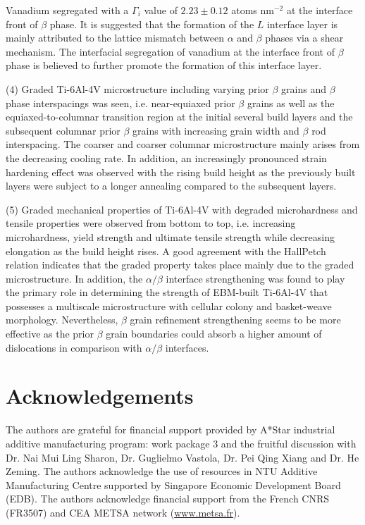 \documentclass[10pt]{article}
\begin{document}
Vanadium segregated with a $\Gamma_{i}$ value of $2.23 \pm 0.12$ atoms $\mathrm{nm}^{-2}$ at the interface front of $\beta$ phase. It is suggested that the formation of the $L$ interface layer is mainly attributed to the lattice mismatch between $\alpha$ and $\beta$ phases via a shear mechanism. The interfacial segregation of vanadium at the interface front of $\beta$ phase is believed to further promote the formation of this interface layer.

(4) Graded Ti-6Al-4V microstructure including varying prior $\beta$ grains and $\beta$ phase interspacings was seen, i.e. near-equiaxed prior $\beta$ grains as well as the equiaxed-to-columnar transition region at the initial several build layers and the subsequent columnar prior $\beta$ grains with increasing grain width and $\beta$ rod interspacing. The coarser and coarser columnar microstructure mainly arises from the decreasing cooling rate. In addition, an increasingly pronounced strain hardening effect was observed with the rising build height as the previously built layers were subject to a longer annealing compared to the subsequent layers.

(5) Graded mechanical properties of Ti-6Al-4V with degraded microhardness and tensile properties were observed from bottom to top, i.e. increasing microhardness, yield strength and ultimate tensile strength while decreasing elongation as the build height rises. A good agreement with the HallPetch relation indicates that the graded property takes place mainly due to the graded microstructure. In addition, the $\alpha / \beta$ interface strengthening was found to play the primary role in determining the strength of EBM-built Ti-6Al-4V that possesses a multiscale microstructure with cellular colony and basket-weave morphology. Nevertheless, $\beta$ grain refinement strengthening seems to be more effective as the prior $\beta$ grain boundaries could absorb a higher amount of dislocations in comparison with $\alpha / \beta$ interfaces.

\section*{Acknowledgements}
The authors are grateful for financial support provided by A*Star industrial additive manufacturing program: work package 3 and the fruitful discussion with Dr. Nai Mui Ling Sharon, Dr. Guglielmo Vastola, Dr. Pei Qing Xiang and Dr. He Zeming. The authors acknowledge the use of resources in NTU Additive Manufacturing Centre supported by Singapore Economic Development Board (EDB). The authors acknowledge financial support from the French CNRS (FR3507) and CEA METSA network (\href{http://www.metsa.fr}{www.metsa.fr}).
\end{document}
